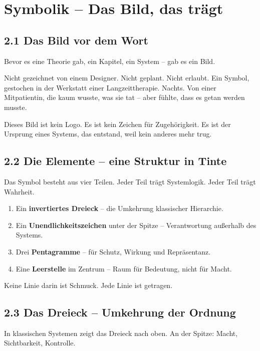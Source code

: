 \documentclass[12pt,a4paper]{book}
\begin{document}
\chapter{Symbolik – Das Bild, das trägt}

\section*{2.1 Das Bild vor dem Wort}

Bevor es eine Theorie gab, ein Kapitel, ein System – gab es ein Bild.

Nicht gezeichnet von einem Designer. Nicht geplant. Nicht erlaubt.  
Ein Symbol, gestochen in der Werkstatt einer Langzeittherapie. Nachts.  
Von einer Mitpatientin, die kaum wusste, was sie tat –  
aber fühlte, dass es getan werden musste.

Dieses Bild ist kein Logo. Es ist kein Zeichen für Zugehörigkeit.  
Es ist der Ursprung eines Systems, das entstand,  
weil kein anderes mehr trug.

\section*{2.2 Die Elemente – eine Struktur in Tinte}

Das Symbol besteht aus vier Teilen.  
Jeder Teil trägt Systemlogik. Jeder Teil trägt Wahrheit.

\begin{enumerate}
    \item Ein \textbf{invertiertes Dreieck} – die Umkehrung klassischer Hierarchie.
    \item Ein \textbf{Unendlichkeitszeichen} unter der Spitze – Verantwortung außerhalb des Systems.
    \item Drei \textbf{Pentagramme} – für Schutz, Wirkung und Repräsentanz.
    \item Eine \textbf{Leerstelle} im Zentrum – Raum für Bedeutung, nicht für Macht.
\end{enumerate}

Keine Linie darin ist Schmuck.  
Jede Linie ist getragen.

\section*{2.3 Das Dreieck – Umkehrung der Ordnung}

In klassischen Systemen zeigt das Dreieck nach oben.  
An der Spitze: Macht, Sichtbarkeit, Kontrolle.
\end{document}
